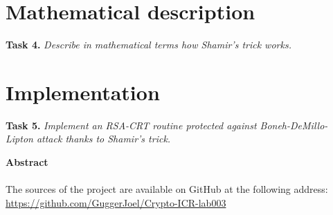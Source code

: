 \documentclass[a4paper]{report}
\begin{document}
\section{Mathematical description}
\textbf{Task 4.} \textit{Describe in mathematical terms how Shamir’s trick works.}

\section{Implementation}
\textbf{Task 5.} \textit{Implement an RSA-CRT routine protected against Boneh-DeMillo-Lipton attack thanks to Shamir’s trick.}


\newpage
\vspace*{6 cm}
\begin{center}
\textbf{Abstract} \\
\ \\
The sources of the project are available on GitHub at the following address: \\
\href{https://github.com/GuggerJoel/Crypto-ICR-lab003}{https://github.com/GuggerJoel/Crypto-ICR-lab003}
\end{center}
\end{document}
